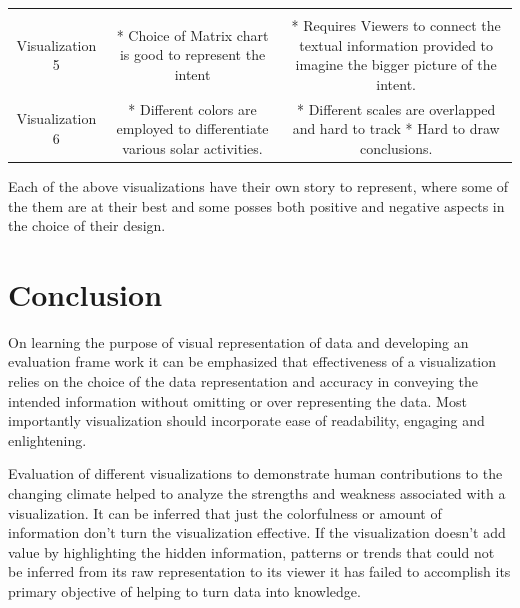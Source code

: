 \documentclass[]{book}
\begin{document}
\begin{longtable}[]{@{}ccc@{}}
\begin{minipage}[t]{0.35\columnwidth}
\end{minipage} & \begin{minipage}[t]{0.49\columnwidth}\centering
\strut
\end{minipage}\tabularnewline
\begin{minipage}[t]{0.08\columnwidth}\centering
Visualization 5\strut
\end{minipage} & \begin{minipage}[t]{0.35\columnwidth}\centering
* Choice of Matrix chart is good to represent the intent\strut
\end{minipage} & \begin{minipage}[t]{0.49\columnwidth}\centering
* Requires Viewers to connect the textual information provided to imagine the bigger picture of the intent.\strut
\end{minipage}\tabularnewline
\begin{minipage}[t]{0.08\columnwidth}\centering
Visualization 6\strut
\end{minipage} & \begin{minipage}[t]{0.35\columnwidth}\centering
* Different colors are employed to differentiate various solar activities.\strut
\end{minipage} & \begin{minipage}[t]{0.49\columnwidth}\centering
* Different scales are overlapped and hard to track * Hard to draw conclusions.\strut
\end{minipage}\tabularnewline
\bottomrule
\end{longtable}

Each of the above visualizations have their own story to represent, where some of the them are at their best and some posses both positive and negative aspects in the choice of their design.

\hypertarget{conclusion}{%
\section{Conclusion}\label{conclusion}}

On learning the purpose of visual representation of data and developing an evaluation frame work it can be emphasized that effectiveness of a visualization relies on the choice of the data representation and accuracy in conveying the intended information without omitting or over representing the data. Most importantly visualization should incorporate ease of readability, engaging and enlightening.

Evaluation of different visualizations to demonstrate human contributions to the changing climate helped to analyze the strengths and weakness associated with a visualization. It can be inferred that just the colorfulness or amount of information don't turn the visualization effective. If the visualization doesn't add value by highlighting the hidden information, patterns or trends that could not be inferred from its raw representation to its viewer it has failed to accomplish its primary objective of helping to turn data into knowledge.
\end{document}
